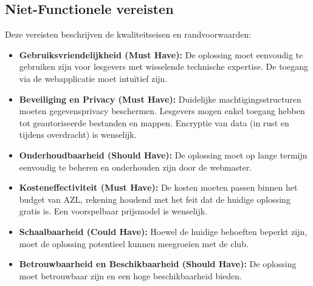 \subsection{Niet-Functionele vereisten}
Deze vereisten beschrijven de kwaliteitseisen en randvoorwaarden:
\begin{itemize}
    \item \textbf{Gebruiksvriendelijkheid (Must Have):} De oplossing moet eenvoudig te gebruiken zijn voor lesgevers met wisselende technische expertise. De toegang via de webapplicatie moet intuïtief zijn.
    \item \textbf{Beveiliging en Privacy (Must Have):} Duidelijke machtigingsstructuren moeten gegevensprivacy beschermen. Lesgevers mogen enkel toegang hebben tot geautoriseerde bestanden en mappen. Encryptie van data (in rust en tijdens overdracht) is wenselijk.
    \item \textbf{Onderhoudbaarheid (Should Have):} De oplossing moet op lange termijn eenvoudig te beheren en onderhouden zijn door de webmaster.
    \item \textbf{Kosteneffectiviteit (Must Have):} De kosten moeten passen binnen het budget van AZL, rekening houdend met het feit dat de huidige oplossing gratis is. Een voorspelbaar prijsmodel is wenselijk.
    \item \textbf{Schaalbaarheid (Could Have):} Hoewel de huidige behoeften beperkt zijn, moet de oplossing potentieel kunnen meegroeien met de club.
    \item \textbf{Betrouwbaarheid en Beschikbaarheid (Should Have):} De oplossing moet betrouwbaar zijn en een hoge beschikbaarheid bieden.
\end{itemize}

